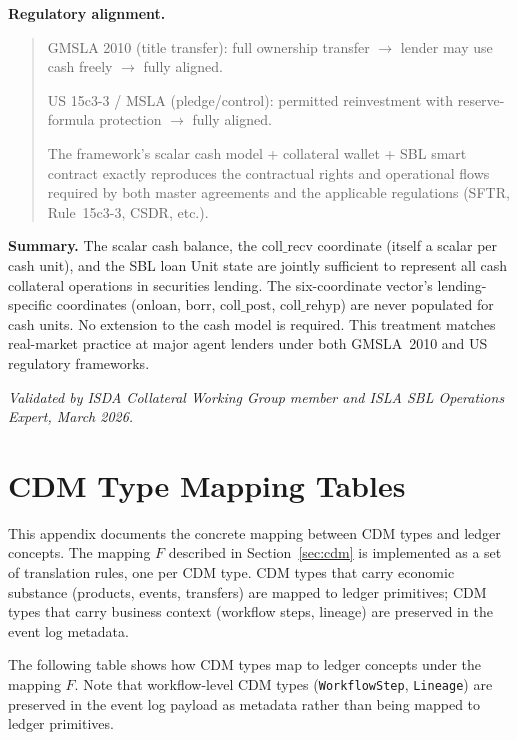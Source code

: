 \documentclass[11pt,a4paper]{article}
\begin{document}
\medskip
\noindent\textbf{Regulatory alignment.}

\begin{quote}
GMSLA 2010 (title transfer): full ownership transfer $\to$ lender may use cash freely $\to$ fully aligned.

US 15c3-3 / MSLA (pledge/control): permitted reinvestment with reserve-formula protection $\to$ fully aligned.

The framework's scalar cash model + collateral wallet + SBL smart contract exactly reproduces the contractual rights and operational flows required by both master agreements and the applicable regulations (SFTR, Rule~15c3-3, CSDR, etc.).
\end{quote}

\noindent\textbf{Summary.} The scalar cash balance, the $\mathrm{coll\_recv}$ coordinate (itself a scalar per cash unit), and the SBL loan Unit state are jointly sufficient to represent all cash collateral operations in securities lending. The six-coordinate vector's lending-specific coordinates ($\mathrm{onloan}$, $\mathrm{borr}$, $\mathrm{coll\_post}$, $\mathrm{coll\_rehyp}$) are never populated for cash units. No extension to the cash model is required. This treatment matches real-market practice at major agent lenders under both GMSLA~2010 and US regulatory frameworks.

\medskip
\textit{Validated by ISDA Collateral Working Group member and ISLA SBL Operations Expert, March 2026.}

\clearpage
\appendix

\section{CDM Type Mapping Tables}
\label{app:cdm-mapping}

This appendix documents the concrete mapping between CDM types and ledger concepts. The mapping $F$ described in Section~\ref{sec:cdm} is implemented as a set of translation rules, one per CDM type. CDM types that carry economic substance (products, events, transfers) are mapped to ledger primitives; CDM types that carry business context (workflow steps, lineage) are preserved in the event log metadata.

The following table shows how CDM types map to ledger concepts under the mapping $F$. Note that workflow-level CDM types (\texttt{WorkflowStep}, \texttt{Lineage}) are preserved in the event log payload as metadata rather than being mapped to ledger primitives.
\end{document}
